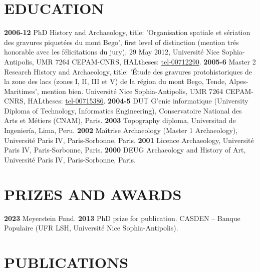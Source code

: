 \documentclass{article}
\begin{document}
\section{EDUCATION}

\textbf{2006-12 }PhD History and Archaeology, title: 'Organisation spatiale et s\'{e}riation des gravures piquet\'{e}es du mont Bego', first level of distinction (mention tr\'{e}s honorable avec les f\'{e}licitations du jury), 29 May 2012, Universit\'{e} Nice Sophia-Antipolis, UMR 7264 CEPAM-CNRS, HALtheses: \href{https://tel.archives-ouvertes.fr/tel-00712290}{tel-00712290}.
\smallbreak
\textbf{2005-6 }Master 2 Research History and Archaeology, title: '\'{E}tude des gravures protohistoriques de la zone des lacs (zones I, II, III et V) de la r\'{e}gion du mont Bego, Tende, Alpes-Maritimes', mention bien. Universit\'{e} Nice Sophia-Antipolis, UMR 7264 CEPAM-CNRS, HALtheses: \href{https://tel.archives-ouvertes.fr/tel-00715386}{tel-00715386}.
\smallbreak
\textbf{2004-5 }DUT G'{e}nie informatique (University Diploma of Technology, Informatics Engineering), Conservatoire National des Arts et M\'{e}tiers (CNAM), Paris.
\smallbreak
\textbf{2003 } Topography diploma, Universitad de Ingenier\'{i}a, Lima, Peru.
\smallbreak
\textbf{2002 } Maîtrise Archaeology (Master 1 Archaeology), Université Paris IV, Paris-Sorbonne, Paris.
\smallbreak
\textbf{2001 } Licence Archaeology, Université Paris IV, Paris-Sorbonne, Paris.
\smallbreak
\textbf{2000 } DEUG Archaeology and History of Art, Université Paris IV, Paris-Sorbonne, Paris.

\section{PRIZES AND AWARDS}

\textbf{2023 }Meyerstein Fund.
\smallbreak
\textbf{2013 }PhD prize for publication. CASDEN -- Banque Populaire (UFR LSH, Universit\'{e} Nice Sophia-Antipolis).
\smallbreak

\section{PUBLICATIONS}
\end{document}
